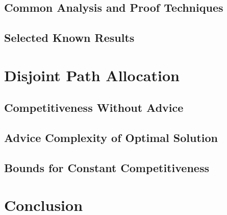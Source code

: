 \documentclass[12pt,a4paper]{report}
\begin{document}
\section{Common Analysis and Proof Techniques}
\label{section:techniques}

\section{Selected Known Results}
\label{section:known-results}


\chapter{Disjoint Path Allocation}
\label{chapter:dpa}

\section{Competitiveness Without Advice}
\label{section:dpa-no-advice}

\section{Advice Complexity of Optimal Solution}
\label{section:dpa-optimal}

%
\section{Bounds for Constant Competitiveness}
\label{section:dpa-constant-compet}


\chapter*{Conclusion}
\label{chapter:conclusion}



\printbibliography

\appendix

%
\end{document}
